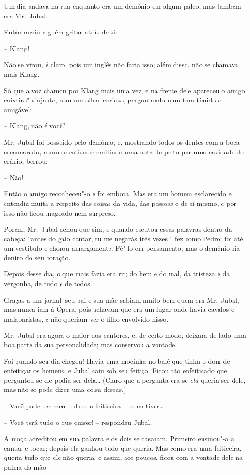 Um dia andava na rua enquanto era um demônio em algum palco, mas também
era Mr.~Jubal.

Então ouviu alguém gritar atrás de si: 

-- Klang! 

Não se virou, é claro, pois um inglês não faria isso; além disso, não se
chamava mais Klang.

Só que a voz chamou por Klang mais uma vez, e na frente dele apareceu o
amigo caixeiro"-viajante, com um olhar curioso, perguntando num tom
tímido e amigável:

-- Klang, não é você?

Mr.~Jubal foi possuído pelo demônio; e, mostrando todos os dentes com a
boca escancarada, como se estivesse emitindo uma nota de peito por uma
cavidade do crânio, berrou: 

-- Não! 

Então o amigo reconheceu"-o e foi embora. Mas era um homem esclarecido
e entendia muita a respeito das coisas da vida, das pessoas e de si
mesmo, e por isso não ficou magoado nem surpreso. 

Porém, Mr.~Jubal achou que sim, e quando escutou essas palavras dentro
da cabeça: ``antes do galo cantar, tu me negarás três vezes'', fez como
Pedro; foi até um vestíbulo e chorou amargamente. Fê"-lo em
pensamento, mas o demônio ria dentro do seu coração.

Depois desse dia, o que mais fazia era rir; do bem e do mal, da tristeza
e da vergonha, de tudo e de todos. 

Graças a um jornal, seu pai e sua mãe sabiam muito bem quem era 
Mr.~Jubal, mas nunca iam à Ópera, pois achavam que era um lugar onde havia
cavalos e malabaristas, e não queriam ver o filho envolvido nisso.

Mr.~Jubal era agora o maior dos cantores, e, de certo modo, deixara de
lado uma boa parte da sua personalidade; mas conservou a vontade.

Foi quando seu dia chegou! Havia uma mocinha no balé que tinha o dom de
enfeitiçar os homens, e Jubal caiu sob seu feitiço. Ficou tão
enfeitiçado que perguntou se ele podia ser dela\ldots{} (Claro que a
pergunta era se \textit{ela} queria ser dele, mas não se pode dizer uma
coisa dessas.)

-- Você pode ser meu -- disse a feiticeira -- se eu tiver\ldots{}

-- Você terá tudo o que quiser! -- respondeu Jubal.

A moça acreditou em sua palavra e os dois se casaram. Primeiro
ensinou"-a a cantar e tocar; depois ela ganhou tudo que queria. Mas
como era uma feiticeira, queria tudo que ele não queria, e assim, aos
poucos, ficou com a vontade dele na palma da mão.


